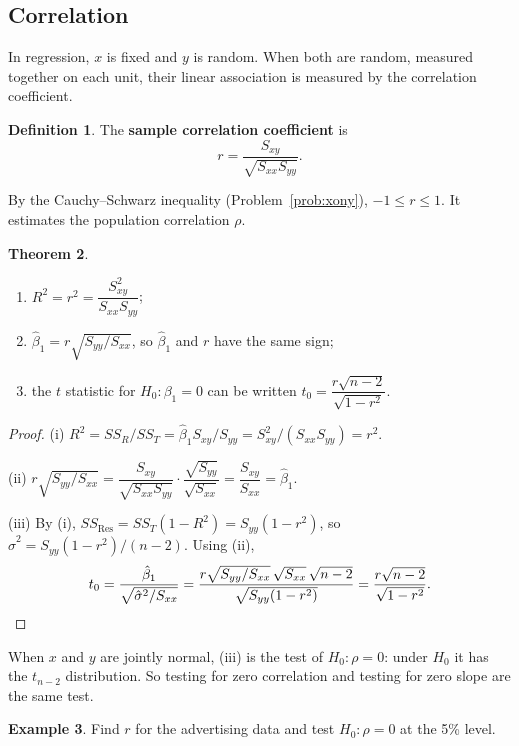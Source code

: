 \documentclass[11pt,a4paper]{article}
\numberwithin{equation}{section}
\theoremstyle{definition}
\newtheorem{thm}{Theorem}[subsection]
\newtheorem{defn}[thm]{Definition}
\newtheorem{exa}[thm]{Example}
\begin{document}
\subsection{Correlation}\label{ssec:corr}
In regression, $x$ is fixed and $y$ is random. When both are random, measured together on
each unit, their linear association is measured by the correlation coefficient.

\begin{defn}
The \textbf{sample correlation coefficient} is
\[
r = \frac{S_{xy}}{\sqrt{S_{xx} S_{yy}}} .
\]
\end{defn}

By the Cauchy--Schwarz inequality (Problem~\ref{prob:xony}), $-1 \le r \le 1$.
It estimates the population correlation $\rho$.

\begin{thm}\label{thm:r2-r}
\begin{enumerate}[label=(\roman*)]
\item $R^2 = r^2 = \dfrac{S_{xy}^2}{S_{xx} S_{yy}}$;
\item $\hat\beta_1 = r \sqrt{S_{yy}/S_{xx}}$, so $\hat\beta_1$ and $r$ have the same sign;
\item the $t$ statistic for $H_0\colon \beta_1 = 0$ can be written
$t_0 = \dfrac{r\sqrt{n-2}}{\sqrt{1 - r^2}}$.
\end{enumerate}
\end{thm}

\begin{proof}
(i) $R^2 = SS_R/SS_T = \hat\beta_1 S_{xy}/S_{yy} = S_{xy}^2/(S_{xx} S_{yy}) = r^2$.

(ii) $r\sqrt{S_{yy}/S_{xx}} = \dfrac{S_{xy}}{\sqrt{S_{xx}S_{yy}}} \cdot \dfrac{\sqrt{S_{yy}}}{\sqrt{S_{xx}}} = \dfrac{S_{xy}}{S_{xx}} = \hat\beta_1$.

(iii) By (i), $SS_{\mathrm{Res}} = SS_T(1 - R^2) = S_{yy}(1 - r^2)$, so
$\hat\sigma^2 = S_{yy}(1 - r^2)/(n-2)$. Using (ii),
\[
t_0 = \frac{\hat\beta_1}{\sqrt{\hat\sigma^2/S_{xx}}}
= \frac{r\sqrt{S_{yy}/S_{xx}}\, \sqrt{S_{xx}}\, \sqrt{n-2}}{\sqrt{S_{yy}(1 - r^2)}}
= \frac{r\sqrt{n-2}}{\sqrt{1 - r^2}} . \qedhere
\]
\end{proof}

When $x$ and $y$ are jointly normal, (iii) is the test of $H_0\colon \rho = 0$: under $H_0$ it
has the $t_{n-2}$ distribution. So testing for zero correlation and testing for zero slope are
the same test.

\begin{exa}
Find $r$ for the advertising data and test $H_0\colon \rho = 0$ at the 5\% level.
\end{exa}
\end{document}
